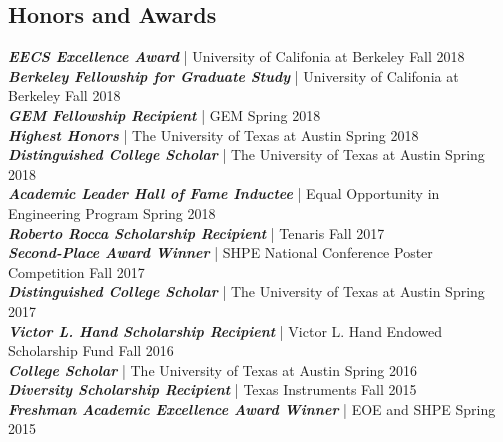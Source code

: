 \documentclass[letter]{res}
\begin{document}
\begin{resume}
\section{Honors and Awards}
{\sl \textbf{EECS Excellence Award}} | University of Califonia at Berkeley \hfill Fall 2018\\
{\sl \textbf{Berkeley Fellowship for Graduate Study}} | University of Califonia at Berkeley \hfill Fall 2018\\
{\sl \textbf{GEM Fellowship Recipient}} | GEM \hfill Spring 2018\\
{\sl \textbf{Highest Honors}} | The University of Texas at Austin  \hfill Spring 2018\\
{\sl \textbf{Distinguished College Scholar}} | The University of Texas at Austin  \hfill Spring 2018\\
{\sl \textbf{Academic Leader Hall of Fame Inductee}} | Equal Opportunity in Engineering Program  \hfill Spring 2018\\
{\sl \textbf{Roberto Rocca Scholarship Recipient}} | Tenaris \hfill Fall 2017\\
{\sl \textbf{Second-Place Award Winner}} | SHPE National Conference Poster Competition  \hfill Fall 2017\\
{\sl \textbf{Distinguished College Scholar}} | The University of Texas at Austin  \hfill Spring 2017\\
{\sl \textbf{Victor L. Hand Scholarship Recipient}} | Victor L. Hand Endowed Scholarship Fund \hfill Fall 2016\\
{\sl \textbf{College Scholar}} | The University of Texas at Austin \hfill Spring 2016\\
{\sl \textbf{Diversity Scholarship Recipient}} | Texas Instruments \hfill Fall 2015\\
{\sl \textbf{Freshman Academic Excellence Award Winner}} | EOE and SHPE \hfill Spring 2015\\

\end{resume}
\end{document}
